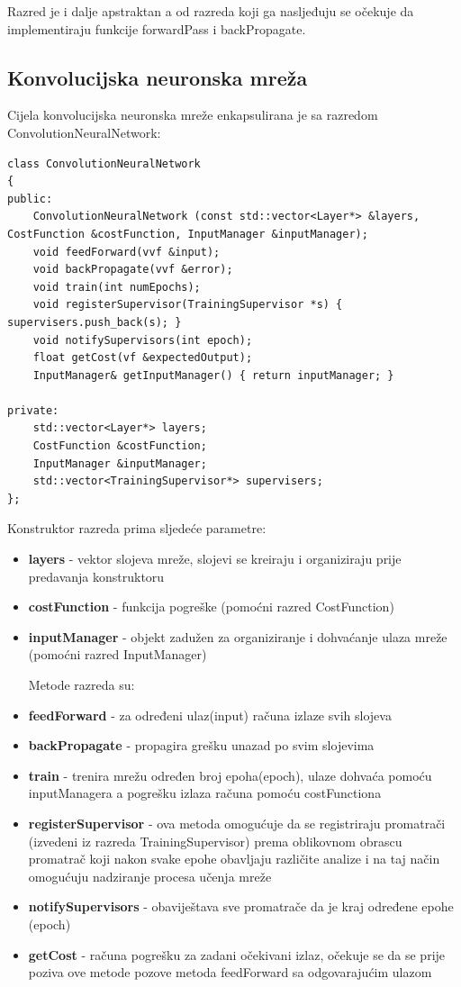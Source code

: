 \documentclass[times, utf8, zavrsni]{fer}
\begin{document}
Razred je i dalje apstraktan a od razreda koji ga nasljeđuju se očekuje da implementiraju funkcije forwardPass i backPropagate.

\subsection{Konvolucijska neuronska mreža}
Cijela konvolucijska neuronska mreže enkapsulirana je sa razredom ConvolutionNeuralNetwork:
\begin{lstlisting}[caption=Razred ConvolutionNeuralNetwork,
  label=CNN]
class ConvolutionNeuralNetwork
{
public:
    ConvolutionNeuralNetwork (const std::vector<Layer*> &layers, CostFunction &costFunction, InputManager &inputManager);
    void feedForward(vvf &input);
    void backPropagate(vvf &error);
    void train(int numEpochs);
    void registerSupervisor(TrainingSupervisor *s) { supervisers.push_back(s); }
    void notifySupervisors(int epoch);
    float getCost(vf &expectedOutput);
    InputManager& getInputManager() { return inputManager; }
    
private:
    std::vector<Layer*> layers;
    CostFunction &costFunction;
    InputManager &inputManager;
    std::vector<TrainingSupervisor*> supervisers;
};
\end{lstlisting}

Konstruktor razreda prima sljedeće parametre:
\begin{itemize}
\item \textbf{layers} - vektor slojeva mreže, slojevi se kreiraju i organiziraju prije predavanja konstruktoru
\item \textbf{costFunction} - funkcija pogreške (pomoćni razred CostFunction)
\item \textbf{inputManager} - objekt zadužen za organiziranje i dohvaćanje ulaza mreže (pomoćni razred InputManager)

Metode razreda su:
\item \textbf{feedForward} - za određeni ulaz(input) računa izlaze svih slojeva
\item \textbf{backPropagate} - propagira grešku unazad po svim slojevima
\item \textbf{train} - trenira mrežu određen broj epoha(epoch), ulaze dohvaća pomoću inputManagera a pogrešku izlaza računa pomoću costFunctiona
\item \textbf{registerSupervisor} - ova metoda omogućuje da se registriraju promatrači (izvedeni iz razreda TrainingSupervisor) prema oblikovnom obrascu promatrač koji nakon svake epohe obavljaju različite analize i na taj način omogućuju nadziranje procesa učenja mreže
\item \textbf{notifySupervisors} - obaviještava sve promatrače da je kraj određene epohe (epoch)
\item \textbf{getCost} - računa pogrešku za zadani očekivani izlaz, očekuje se da se prije poziva ove metode pozove metoda feedForward sa odgovarajućim ulazom
\end{itemize}
\end{document}
